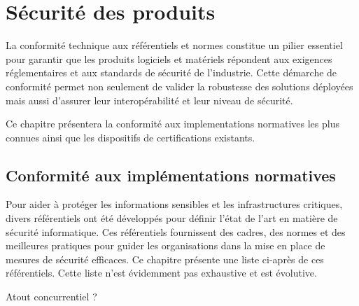 \section{Sécurité des produits}


La conformité technique aux référentiels et normes constitue un pilier essentiel pour garantir que les produits logiciels et matériels répondent aux exigences réglementaires et aux standards de sécurité de l'industrie. Cette démarche de conformité permet non seulement de valider la robustesse des solutions déployées mais aussi d'assurer leur interopérabilité et leur niveau de sécurité.

Ce chapitre présentera la conformité aux implementations normatives les plus connues ainsi que les dispositifs de certifications existants.

\subsection{Conformité aux implémentations normatives}
Pour aider à protéger les informations sensibles et les infrastructures critiques, divers référentiels ont été développés pour définir l'état de l'art en matière de sécurité informatique. Ces référentiels fournissent des cadres, des normes et des meilleures pratiques pour guider les organisations dans la mise en place de mesures de sécurité efficaces. Ce chapitre présente une liste ci-après de ces référentiels. Cette liste n'est évidemment pas exhaustive et est évolutive.

Atout concurrentiel ?

